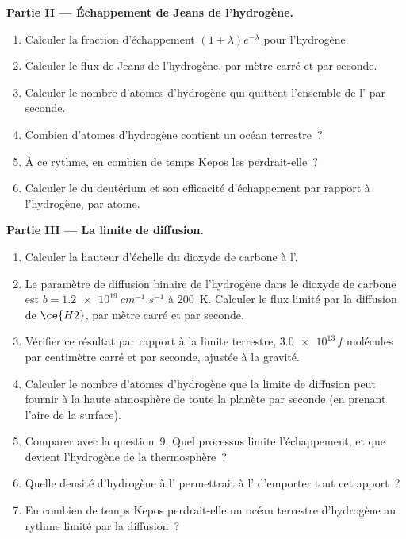 \begin{problem}
\medskip\noindent\textbf{Partie II --- Échappement de Jeans de l'hydrogène.}
\begin{enumerate}[resume]
\item Calculer la fraction d'échappement $(1 + \lambda)e^{-\lambda}$ pour
  l'hydrogène.
\item Calculer le flux de Jeans de l'hydrogène, par mètre carré et par seconde.
\item Calculer le nombre d'atomes d'hydrogène qui quittent l'ensemble de
  l' par seconde.
\item Combien d'atomes d'hydrogène contient un océan terrestre~?
\item À ce rythme, en combien de temps Kepos les perdrait-elle~?
\item Calculer le  du deutérium et son efficacité
  d'échappement par rapport à l'hydrogène, par atome.
\end{enumerate}

\medskip\noindent\textbf{Partie III --- La limite de diffusion.}
\begin{enumerate}[resume]
\item Calculer la hauteur d'échelle du dioxyde de carbone à l'.
\item Le paramètre de diffusion binaire de l'hydrogène dans le dioxyde de carbone est
  $b = \qty{1.2e19}{cm^{-1}.s^{-1}}$ à \qty{200}{K}. Calculer le
  flux limité par la diffusion de $\ce{H2}$, par mètre carré et par seconde.
\item Vérifier ce résultat par rapport à la limite terrestre, $\num{3.0e13}\,f$ molécules par
  centimètre carré et par seconde, ajustée à la gravité.
\item Calculer le nombre d'atomes d'hydrogène que la limite de diffusion peut
  fournir à la haute atmosphère de toute la planète par seconde (en prenant
  l'aire de la surface).
\item Comparer avec la question~9. Quel processus limite l'échappement, et que
  devient l'hydrogène de la thermosphère~?
\item Quelle densité d'hydrogène à l' permettrait à l'
  d'emporter tout cet apport~?
\item En combien de temps Kepos perdrait-elle un océan terrestre d'hydrogène
  au rythme limité par la diffusion~?
\end{enumerate}


\end{problem}
